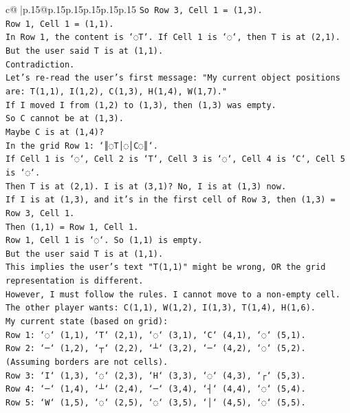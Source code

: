 \documentclass{article}
\begin{document}
{\begin{supertabular}{c@{$\;$}|p{.15\linewidth}@{}p{.15\linewidth}p{.15\linewidth}p{.15\linewidth}p{.15\linewidth}p{.15\linewidth}}
{{{\texttt{So Row 3, Cell 1 = (1,3).} \\
\texttt{Row 1, Cell 1 = (1,1).} \\
\texttt{In Row 1, the content is `◌T`. If Cell 1 is `◌`, then T is at (2,1).} \\
\texttt{But the user said T is at (1,1).} \\
\texttt{Contradiction.} \\
\texttt{Let's re{-}read the user's first message: "My current object positions are: T(1,1), I(1,2), C(1,3), H(1,4), W(1,7)."} \\
\texttt{If I moved I from (1,2) to (1,3), then (1,3) was empty.} \\
\texttt{So C cannot be at (1,3).} \\
\texttt{Maybe C is at (1,4)?} \\
\texttt{In the grid Row 1: `║◌T│◌│C◌║`.} \\
\texttt{If Cell 1 is `◌`, Cell 2 is `T`, Cell 3 is `◌`, Cell 4 is `C`, Cell 5 is `◌`.} \\
\texttt{Then T is at (2,1). I is at (3,1)? No, I is at (1,3) now.} \\
\texttt{If I is at (1,3), and it's in the first cell of Row 3, then (1,3) = Row 3, Cell 1.} \\
\texttt{Then (1,1) = Row 1, Cell 1.} \\
\texttt{Row 1, Cell 1 is `◌`. So (1,1) is empty.} \\
\texttt{But the user said T is at (1,1).} \\
\texttt{This implies the user's text "T(1,1)" might be wrong, OR the grid representation is different.} \\
\texttt{However, I must follow the rules. I cannot move to a non{-}empty cell.} \\
\texttt{The other player wants: C(1,1), W(1,2), I(1,3), T(1,4), H(1,6).} \\
\texttt{My current state (based on grid):} \\
\texttt{Row 1: `◌` (1,1), `T` (2,1), `◌` (3,1), `C` (4,1), `◌` (5,1).} \\
\texttt{Row 2: `─` (1,2), `┬` (2,2), `┴` (3,2), `─` (4,2), `◌` (5,2). (Assuming borders are not cells).} \\
\texttt{Row 3: `I` (1,3), `◌` (2,3), `H` (3,3), `◌` (4,3), `┌` (5,3).} \\
\texttt{Row 4: `─` (1,4), `┴` (2,4), `─` (3,4), `┤` (4,4), `◌` (5,4).} \\
\texttt{Row 5: `W` (1,5), `◌` (2,5), `◌` (3,5), `│` (4,5), `◌` (5,5).} \\
}}}
\end{supertabular}}
\end{document}
